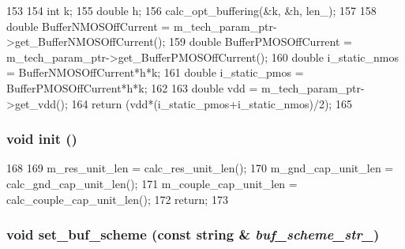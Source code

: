 \begin{DoxyCode}
153 {
154     int k;
155     double h;
156     calc_opt_buffering(&k, &h, len_);
157 
158     double BufferNMOSOffCurrent = m_tech_param_ptr->get_BufferNMOSOffCurrent();
159     double BufferPMOSOffCurrent = m_tech_param_ptr->get_BufferPMOSOffCurrent();
160     double i_static_nmos = BufferNMOSOffCurrent*h*k;
161     double i_static_pmos = BufferPMOSOffCurrent*h*k;
162 
163     double vdd = m_tech_param_ptr->get_vdd();
164     return (vdd*(i_static_pmos+i_static_nmos)/2);
165 }
\end{DoxyCode}
\hypertarget{classWire_a02fd73d861ef2e4aabb38c0c9ff82947}{
\subsubsection[{init}]{\setlength{\rightskip}{0pt plus 5cm}void init ()}}
\label{classWire_a02fd73d861ef2e4aabb38c0c9ff82947}



\begin{DoxyCode}
168 {
169     m_res_unit_len = calc_res_unit_len();
170     m_gnd_cap_unit_len = calc_gnd_cap_unit_len();
171     m_couple_cap_unit_len = calc_couple_cap_unit_len();
172     return;
173 }
\end{DoxyCode}
\hypertarget{classWire_a325bc6dca0ef49f0a342ab21009c093f}{
\subsubsection[{set\_\-buf\_\-scheme}]{\setlength{\rightskip}{0pt plus 5cm}void set\_\-buf\_\-scheme (const string \& {\em buf\_\-scheme\_\-str\_\-})}}
\label{classWire_a325bc6dca0ef49f0a342ab21009c093f}



